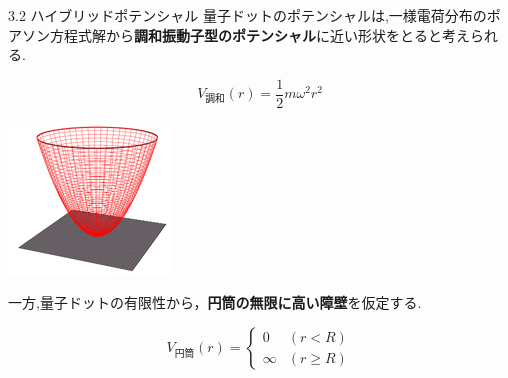 \documentclass{beamer}
\begin{document}
\begin{frame}{3.2 ハイブリッドポテンシャル}
\footnotesize
  量子ドットのポテンシャルは,一様電荷分布のポアソン方程式解から\textbf{調和振動子型のポテンシャル}に近い形状をとると考えられる.
  
  \vspace{-1.0em}
  \begin{minipage}{0.7\textwidth}
  \begin{equation}
  V_{調和}(r)=\frac{1}{2}m\omega^2r^2
  \end{equation}
  \end{minipage}
  \hfill
  \vspace{-1.0em}
  \begin{minipage}{0.28\textwidth}
  \includegraphics[width=0.8\linewidth]{images/調和.png} \\
  \end{minipage}
  一方,量子ドットの有限性から，\textbf{円筒の無限に高い障壁}を仮定する.
  \begin{minipage}{0.7\textwidth}
  \begin{equation}
  V_{円筒}(r) =
  \begin{cases}
  0 & (r < R) \\
  \infty & (r \geq R)
  \end{cases}
  \end{equation}
  \end{minipage}
  \hfill
    \vspace{-1.0em}
  \begin{minipage}{0.28\textwidth}

\end{minipage}
\end{frame}
\end{document}
